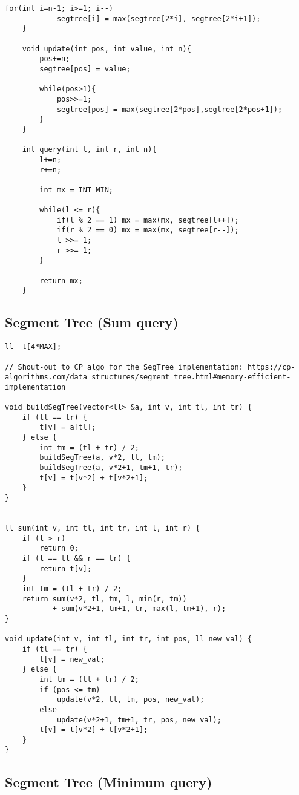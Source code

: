 \documentclass[10pt]{article}
\begin{document}
\begin{multicols*}{2}
\begin{lstlisting}[style=compactcpp]
        for(int i=n-1; i>=1; i--)
            segtree[i] = max(segtree[2*i], segtree[2*i+1]);
    }

    void update(int pos, int value, int n){
        pos+=n;
        segtree[pos] = value;

        while(pos>1){
            pos>>=1;
            segtree[pos] = max(segtree[2*pos],segtree[2*pos+1]);
        }
    }

    int query(int l, int r, int n){
        l+=n;
        r+=n;

        int mx = INT_MIN;

        while(l <= r){
            if(l % 2 == 1) mx = max(mx, segtree[l++]);
            if(r % 2 == 0) mx = max(mx, segtree[r--]);  
            l >>= 1;
            r >>= 1;
        }

        return mx;
    }
\end{lstlisting}

\subsection{Segment Tree (Sum query)}

\begin{lstlisting}[style=compactcpp]
ll  t[4*MAX];
 
// Shout-out to CP algo for the SegTree implementation: https://cp-algorithms.com/data_structures/segment_tree.html#memory-efficient-implementation
 
void buildSegTree(vector<ll> &a, int v, int tl, int tr) {
    if (tl == tr) {
        t[v] = a[tl];
    } else {
        int tm = (tl + tr) / 2;
        buildSegTree(a, v*2, tl, tm);
        buildSegTree(a, v*2+1, tm+1, tr);
        t[v] = t[v*2] + t[v*2+1];
    }
}
 
 
ll sum(int v, int tl, int tr, int l, int r) {
    if (l > r) 
        return 0;
    if (l == tl && r == tr) {
        return t[v];
    }
    int tm = (tl + tr) / 2;
    return sum(v*2, tl, tm, l, min(r, tm))
           + sum(v*2+1, tm+1, tr, max(l, tm+1), r);
}
 
void update(int v, int tl, int tr, int pos, ll new_val) {
    if (tl == tr) {
        t[v] = new_val;
    } else {
        int tm = (tl + tr) / 2;
        if (pos <= tm)
            update(v*2, tl, tm, pos, new_val);
        else
            update(v*2+1, tm+1, tr, pos, new_val);
        t[v] = t[v*2] + t[v*2+1];
    }
}
\end{lstlisting}

\subsection{Segment Tree (Minimum query)}


\end{multicols*}
\end{document}

